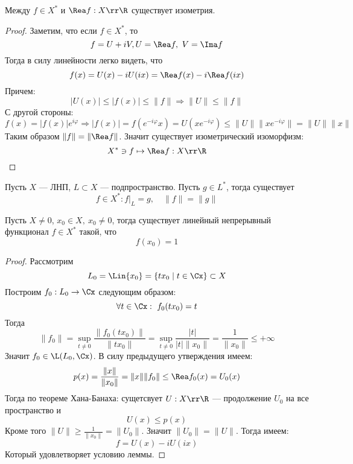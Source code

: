 \begin{claim}
	Между $f \in X^*$ и $\Rea f: X \rr \R$ существует изометрия.
\end{claim}
\begin{proof}
Заметим, что если $f \in X^*$, то 
$$
f = U + iV, U = \Rea f, \ V = \Ima f
$$
Тогда в силу линейности легко видеть, что 
$$
f(x) = U(x) - iU(ix) = \Rea f(x) - i \Rea f(ix)
$$
Причем: 
$$
|U(x)| \leq |f(x)| \leq \|f\| \Rightarrow \|U\| \leq \|f\|
$$
С другой стороны:
$$
f(x) = |f(x)|e^{i \varphi} \Rightarrow |f(x)| = f(e^{-i \varphi} x ) = U(x e^{-i\varphi}) \leq \|U\| \|x e^{-i\varphi}\| = \|U\|\|x\| 
$$
Таким образом $\|f\| = \|\Rea f\|$. Значит существует изометрический изоморфизм:
$$
X^* \ni f \mapsto \Rea f: X \rr \R 
$$
\end{proof}
\begin{next0}
	Пусть $X$ --- ЛНП, $L \subset X$ --- подпространство. Пусть $g \in L^*$, тогда существует 
	$$
	f \in X^*\colon f\big|_L = g, \quad \|f\| = \|g\|
	$$
\end{next0}

\begin{lemma}\label{lem:f}
	Пусть $X \neq 0$, $x_0 \in X, \ x_0 \neq 0$, тогда существует линейный непрерывный функционал $f \in X^*$ такой, что 
	$$
	f(x_0) = 1 
	$$
\end{lemma}
\begin{proof}
	Рассмотрим 
	$$
	L_0 = \Lin{x_0} = \{t x_0 \mid t \in \Cx \} \subset X
	$$
	Построим  $f_0: L_0 \to \Cx$ следующим образом:
	$$
	\forall t \in \Cx: \ f_0(tx_0) = t 
	$$
	Тогда 
	$$
	\|f_0\| = \sup\limits_{ t \neq 0}\frac{\|f_0(t x_0)\|}{\|tx_0\|} = \sup\limits_{ t \neq 0}\frac{|t|}{|t| \|x_0\|} = \frac{1}{\|x_0\|} \leq + \infty
	$$
	Значит $f_0 \in \L(L_0, \Cx)$. В силу предыдущего утверждения имеем:
	$$
	p(x) = \frac{\|x\|}{\|x_0\|} = \|x\| \|f_0\| \leq \Rea f_0 (x) = U_0(x)
	$$
	Тогда по теореме Хана-Банаха: сущетсвует $U: X \rr \R$ --- продолжение $U_0$ на все пространство и 
	$$
	U(x) \leq p(x)
	$$
	Кроме того $\|U\| \geq \frac{1}{\|x_0\|} = \|U_0\|$. Значит $\|U_0\| =  \|U\|$. Тогда имеем:
	$$
	f = U(x) - iU(ix)
	$$
	Который удовлетворяет условию леммы.
\end{proof}

